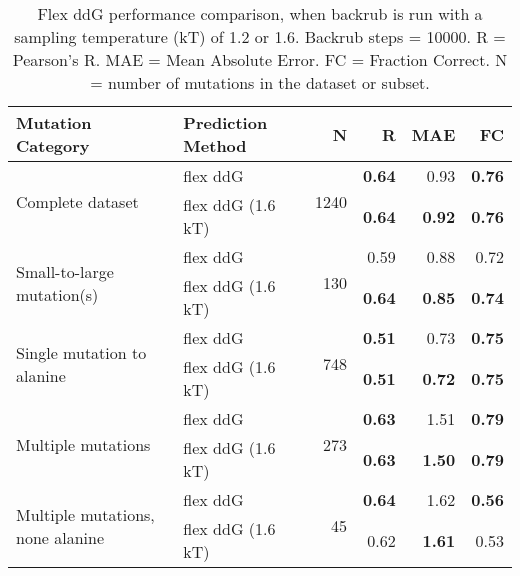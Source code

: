 \begin{table}
  \begin{tabular}{llrrrr}
\toprule
Mutation Category &  Prediction Method &     N &    R &  MAE &   FC \\
\midrule
 \multirow{ 2}{*}{Complete dataset} & flex ddG & \multirow{ 2}{*}{1240} & \textbf{0.64} & 0.93 & \textbf{0.76}  \\
 & flex ddG (1.6 kT) & & \textbf{0.64} & \textbf{0.92} & \textbf{0.76}  \\
\hline
 \multirow{ 2}{*}{Small-to-large mutation(s)} & flex ddG & \multirow{ 2}{*}{130} & 0.59 & 0.88 & 0.72  \\
 & flex ddG (1.6 kT) & & \textbf{0.64} & \textbf{0.85} & \textbf{0.74}  \\
\hline
 \multirow{ 2}{*}{Single mutation to alanine} & flex ddG & \multirow{ 2}{*}{748} & \textbf{0.51} & 0.73 & \textbf{0.75}  \\
 & flex ddG (1.6 kT) & & \textbf{0.51} & \textbf{0.72} & \textbf{0.75}  \\
\hline
 \multirow{ 2}{*}{Multiple mutations} & flex ddG & \multirow{ 2}{*}{273} & \textbf{0.63} & 1.51 & \textbf{0.79}  \\
 & flex ddG (1.6 kT) & & \textbf{0.63} & \textbf{1.50} & \textbf{0.79}  \\
\hline
 \multirow{ 2}{*}{Multiple mutations, none alanine} & flex ddG & \multirow{ 2}{*}{45} & \textbf{0.64} & 1.62 & \textbf{0.56}  \\
 & flex ddG (1.6 kT) & & 0.62 & \textbf{1.61} & 0.53  \\
\bottomrule
\end{tabular}
  \caption[Comparison of backrub temperature results]{
    Flex ddG performance comparison, when backrub is run with a sampling temperature (kT) of 1.2 or 1.6. Backrub steps = 10000. R = Pearson's R. MAE = Mean Absolute Error. FC = Fraction Correct. N = number of mutations in the dataset or subset.
  } \label{tab:table-temperature}
\end{table}
